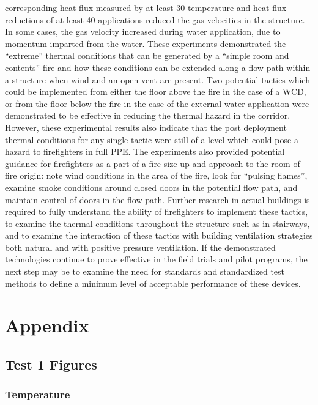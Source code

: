 \documentclass[12pt,oneside]{book}
\begin{document}
corresponding heat flux measured by at least 30 %
temperature and heat flux reductions of at least 40 %
applications reduced the gas velocities in the structure. In some cases, the gas velocity increased during
water application, due to momentum imparted from the water.
These experiments demonstrated the “extreme” thermal conditions that can be generated by a “simple
room and contents” fire and how these conditions can be extended along a flow path within a structure
when wind and an open vent are present. Two potential tactics which could be implemented from either
the floor above the fire in the case of a WCD, or from the floor below the fire in the case of the external
water application were demonstrated to be effective in reducing the thermal hazard in the corridor.
However, these experimental results also indicate that the post deployment thermal conditions for any
single tactic were still of a level which could pose a hazard to firefighters in full PPE.
The experiments also provided potential guidance for firefighters as a part of a fire size up and approach
to the room of fire origin: note wind conditions in the area of the fire, look for “pulsing flames”,
examine smoke conditions around closed doors in the potential flow path, and maintain control of doors
in the flow path.
Further research in actual buildings is required to fully understand the ability of firefighters to
implement these tactics, to examine the thermal conditions throughout the structure such as in stairways,
and to examine the interaction of these tactics with building ventilation strategies both natural and with
positive pressure ventilation.
If the demonstrated technologies continue to prove effective in the field trials and pilot programs, the
next step may be to examine the need for standards and standardized test methods to define a minimum
level of acceptable performance of these devices.

\chapter{Appendix}
\label{chap:Appendix}

\section{Test 1 Figures}
\label{subsec:Test_1_Figures}

\subsection{Temperature}
\label{subsec:Temperature}
\end{document}

